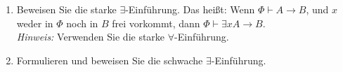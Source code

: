 
\begin{exercise}[104 + 105]
\phantom{}
\begin{enumerate}
  \item Beweisen Sie die starke $\exists$-Einführung. Das heißt: Wenn $\Phi \vdash A \rightarrow B$,
  und $x$ weder in $\Phi$ noch in $B$ frei vorkommt, dann $\Phi \vdash \exists x A \rightarrow B$. \\
  \textit{Hinweis:} Verwenden Sie die starke $\forall$-Einführung.
  \item Formulieren und beweisen Sie die schwache $\exists$-Einführung.

\end{enumerate}


\end{exercise}


